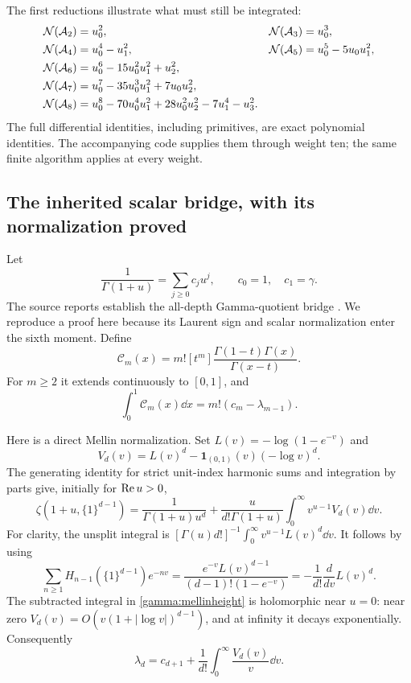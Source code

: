 The first reductions illustrate what must still be integrated:
\begin{align}
 \mathcal N(\mathcal A_2)&=u_0^2,&
 \mathcal N(\mathcal A_3)&=u_0^3,\notag\\
 \mathcal N(\mathcal A_4)&=u_0^4-u_1^2,&
 \mathcal N(\mathcal A_5)&=u_0^5-5u_0u_1^2,\notag\\
 \mathcal N(\mathcal A_6)&=u_0^6-15u_0^2u_1^2+u_2^2,\label{gamma:firstforms}\\
 \mathcal N(\mathcal A_7)&=u_0^7-35u_0^3u_1^2+7u_0u_2^2,\notag\\
 \mathcal N(\mathcal A_8)&=u_0^8-70u_0^4u_1^2+28u_0^2u_2^2-7u_1^4-u_3^2.
 \notag
\end{align}
The full differential identities, including primitives, are exact
polynomial identities.  The accompanying code supplies them through
weight ten; the same finite algorithm applies at every weight.

\subsection{The inherited scalar bridge, with its normalization proved}

Let
\begin{equation}\label{gamma:c}
 \frac1{\Gamma(1+u)}=\sum_{j\ge0}c_j u^j,
 \qquad c_0=1,\quad c_1=\gamma.
\end{equation}
The source reports establish the all-depth Gamma-quotient bridge
\cite[\S3]{SourceCanonical}.  We reproduce a proof here because its
Laurent sign and scalar normalization enter the sixth moment.
Define
\begin{equation}\label{gamma:C}
 \mathcal C_m(x)=m![t^m]
       \frac{\Gamma(1-t)\Gamma(x)}{\Gamma(x-t)}.
\end{equation}
For $m\ge2$ it extends continuously to $[0,1]$, and
\begin{equation}\label{gamma:Cintegral}
 \int_0^1\mathcal C_m(x)\dd x=m!(c_m-\lambda_{m-1}).
\end{equation}

Here is a direct Mellin normalization.  Set
$L(v)=-\log(1-e^{-v})$ and
\[
 V_d(v)=L(v)^d-\boldsymbol1_{(0,1)}(v)(-\log v)^d.
\]
The generating identity for strict unit-index harmonic sums and
integration by parts give, initially for $\operatorname{Re} u>0$,
\begin{equation}\label{gamma:mellinheight}
 \zeta(1+u,\{1\}^{d-1})
 =\frac1{\Gamma(1+u)u^d}
  +\frac{u}{d!\Gamma(1+u)}\int_0^\infty v^{u-1}V_d(v)\dd v.
\end{equation}
For clarity, the unsplit integral is
$[\Gamma(u)d!]^{-1}\int_0^\infty v^{u-1}L(v)^d\dd v$.
It follows by using
\[
 \sum_{n\ge1}H_{n-1}(\{1\}^{d-1})e^{-nv}
 =\frac{e^{-v}L(v)^{d-1}}{(d-1)!(1-e^{-v})}
 =-\frac1{d!}\frac d{dv}L(v)^d.
\]
The subtracted integral in \eqref{gamma:mellinheight} is holomorphic
near $u=0$: near zero $V_d(v)=O(v(1+|\log v|)^{d-1})$, and at
infinity it decays exponentially.  Consequently
\begin{equation}\label{gamma:lambda-integral}
 \lambda_d=c_{d+1}+\frac1{d!}\int_0^\infty\frac{V_d(v)}v\dd v.
\end{equation}

